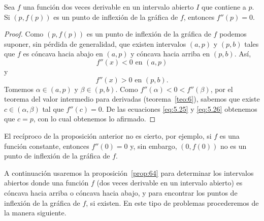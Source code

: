 \documentclass[12pt,a4paper]{book}
\begin{document}
    \begin{proposicion}\label{prop:64}
        Sea $f$ una función dos veces derivable
        en un intervalo abierto $I$ que contiene a $p$. Si $(p,f(p))$ es un punto
        de inflexión de la gráfica de $f$, entonces $f''(p)=0$.
    \end{proposicion}

    \begin{proof}
        Como $(p,f(p))$ es un punto de inflexión de la gráfica de $f$
        podemos suponer, sin pérdida de generalidad, que existen intervalos $(a,p)$ y
        $(p,b)$ tales que $f$ es cóncava hacia abajo en $(a,p)$ y cóncava hacia arriba en
        $(p,b)$. Así,
        \begin{equation}\label{eq:5.25}
            f''(x)<0\text{ en }(a,p)
        \end{equation}
        y
        \begin{equation}\label{eq:5.26}
            f''(x)>0\text{ en }(p,b).
        \end{equation}
        Tomemos $\alpha\in(a,p)$ y $\beta\in(p,b)$. Como $f''(\alpha)<0<f''(\beta)$, por el teorema
        del valor intermedio para derivadas (teorema~\ref{teo:6}), sabemos que existe $c\in(\alpha,\beta)$
        tal que $f''(c)=0$. De las ecuaciones \eqref{eq:5.25} y \eqref{eq:5.26} obtenemos que $c=p$,
        con lo cual obtenemos lo afirmado.
    \end{proof}

    El recíproco de la proposición anterior no es cierto, por ejemplo, si $f$ es
    una función constante, entonces $f''(0)=0$ y, sin embargo, $(0,f(0))$ no es un
    punto de inflexión de la gráfica de $f$.

    A continuación usaremos la proposición~\ref{prop:64} para determinar los intervalos
    abiertos donde una función $f$ (dos veces derivable en un intervalo abierto) es
    cóncava hacia arriba o cóncava hacia abajo, y para encontrar los puntos de
    inflexión de la gráfica de $f$, si existen. En este tipo de problemas procederemos
    de la manera siguiente.
\end{document}
